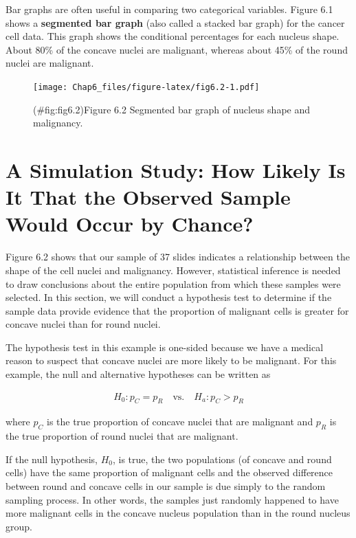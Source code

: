 \documentclass[
]{report}
\begin{document}
Bar graphs are often useful in comparing two categorical variables. Figure 6.1 shows a \textbf{segmented bar graph} (also called a stacked bar graph) for the cancer cell data. This graph shows the conditional percentages
for each nucleus shape. About 80\% of the concave nuclei are malignant, whereas about 45\% of the round
nuclei are malignant.

\begin{figure}
\centering
\texttt{[image: Chap6\_files/figure-latex/fig6.2-1.pdf]}
\caption{(\#fig:fig6.2)Figure 6.2 Segmented bar graph of nucleus shape and malignancy.}
\end{figure}

\section{\texorpdfstring{\textbf{A Simulation Study: How Likely Is It That the Observed Sample Would Occur by Chance?}}{A Simulation Study: How Likely Is It That the Observed Sample Would Occur by Chance?}}\label{a-simulation-study-how-likely-is-it-that-the-observed-sample-would-occur-by-chance}

Figure 6.2 shows that our sample of 37 slides indicates a relationship between the shape of the cell nuclei and malignancy. However, statistical inference is needed to draw conclusions about the entire population from which these samples were selected. In this section, we will conduct a hypothesis test to determine if the sample data provide evidence that the proportion of malignant cells is greater for concave nuclei than for round nuclei.

The hypothesis test in this example is one-sided because we have a medical reason to suspect that concave nuclei are more likely to be malignant. For this example, the null and alternative hypotheses can be written as

\begin{align}\label{6.1}
H_0: p_C = p_R \quad\text{vs.}\quad H_a: p_C > p_R 
\tag{6.1}
\end{align}

where \(p_C\) is the true proportion of concave nuclei that are malignant and \(p_R\) is the true proportion of round nuclei that are malignant.

If the null hypothesis, \(H_0\), is true, the two populations (of concave and round cells) have the same proportion of malignant cells and the observed difference between round and concave cells in our sample is due simply to the random sampling process. In other words, the samples just randomly happened to have more malignant cells in the concave nucleus population than in the round nucleus group.
\end{document}
